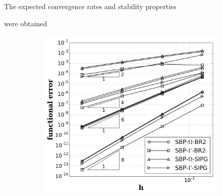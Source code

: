 \documentclass[final]{beamer}
\newlength{\thirdcolwid}
\newcommand{\fnc}[1]{\ensuremath{\mathcal{#1}}}
\newcommand{\mat}[1]{\ensuremath{\mathsf{#1}}}
\newcommand{\Sig}[0]{\mat{\Sigma}}
\begin{document}
\begin{frame}[t]
\begin{columns}[t]
\begin{column}{\thirdcolwid}
\begin{alertblock}{The expected convergence rates and stability properties 
        
        were obtained}
\begin{itemize}
\begin{figure}
\begin{subfigure}[b]{0.48\linewidth}
            \includegraphics[width=1.\linewidth]{figures/j_accuracy.png}
        \end{subfigure}
    \end{figure}
%          

\end{itemize}
\end{alertblock}
\end{column}
\end{columns}
\end{frame}
\end{document}
